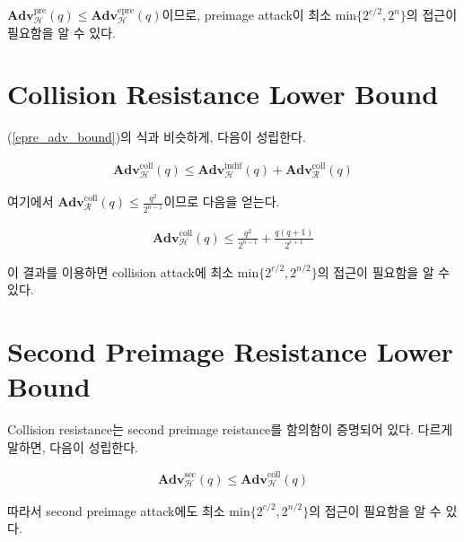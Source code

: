 \documentclass{article}
\newcommand{\adv}{\mathbf{Adv}}
\begin{document}
  \(\adv^\text{pre}_\mathcal{H}(q) \leq \adv^\text{epre}_\mathcal{H}(q)\)이므로\cite{rogaway_cryptographic_2004}, preimage attack이 최소 \(\mathrm{min}\{2^{c/2}, 2^n\}\)의 접근이 필요함을 알 수 있다.

  \section{Collision Resistance Lower Bound}
  (\ref{epre_adv_bound})의 식과 비슷하게, 다음이 성립한다.

  \begin{align*}
    \adv^\text{coll}_\mathcal{H}(q) \leq \adv^\text{indif}_\mathcal{H}(q) + \adv^\text{coll}_\mathcal{R}(q)
  \end{align*}

  여기에서 \(\adv^\text{coll}_\mathcal{R}(q) \leq \frac{q^2}{2^{n - 1}}\)이므로 다음을 얻는다.

  \begin{align*}
    \adv^\text{coll}_\mathcal{H}(q) \leq \frac{q^2}{2^{n - 1}} + \frac{q(q + 1)}{2^{c + 1}}
  \end{align*}

  이 결과를 이용하면 collision attack에 최소 \(\mathrm{min}\{2^{c/2}, 2^{n/2}\}\)의 접근이 필요함을 알 수 있다.

  \section{Second Preimage Resistance Lower Bound}
  Collision resistance는 second preimage reistance를 함의함이 증명되어 있다.\cite{rogaway_cryptographic_2004} 다르게 말하면, 다음이 성립한다.

  \begin{align*}
    \adv^\text{sec}_\mathcal{H}(q) \leq \adv^\text{coll}_\mathcal{H}(q)
  \end{align*}

  따라서 second preimage attack에도 최소 \(\mathrm{min}\{2^{c/2}, 2^{n/2}\}\)의 접근이 필요함을 알 수 있다.
  \printbibliography
\end{document}
